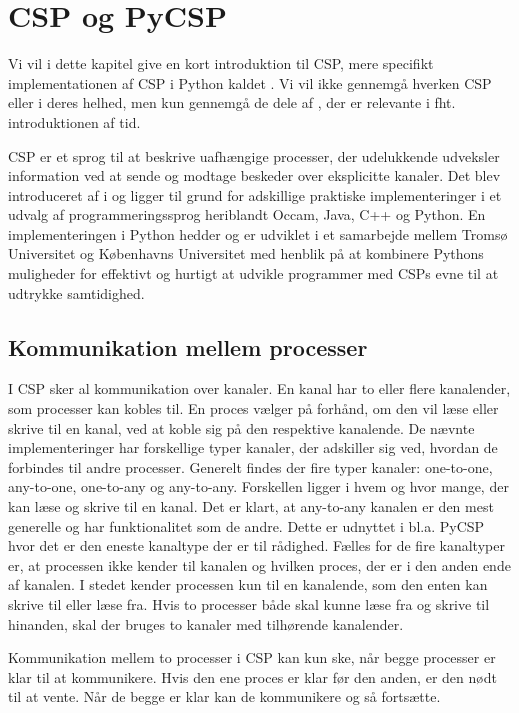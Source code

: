 \chapter{CSP og PyCSP}\label{chap:csp}

Vi vil i dette kapitel give en kort introduktion til CSP, mere specifikt implementationen af CSP i Python kaldet \pycsp. Vi vil ikke gennemgå hverken CSP eller \pycsp i deres helhed, men kun gennemgå de dele af \pycsp, der er relevante i fht. introduktionen af tid. 

CSP er et sprog til at beskrive uafhængige processer, der udelukkende udveksler information ved at sende og modtage beskeder over eksplicitte kanaler. Det blev introduceret af \citeauthor{hoare-csp} i \cite{hoare-csp} og ligger til grund for adskillige praktiske implementeringer i et udvalg af programmeringssprog heriblandt Occam, Java, C++ og Python\cite{May1983, jcsp, Brown2007, pycsp}. En implementeringen i Python hedder \pycsp og er udviklet i et samarbejde mellem Tromsø Universitet og Københavns Universitet med henblik på at kombinere  Pythons muligheder  for effektivt og hurtigt at udvikle programmer med CSPs evne til at udtrykke samtidighed\cite{pycsp}. 

\section{Kommunikation mellem processer}
I CSP sker al kommunikation over kanaler. En kanal har to eller flere kanalender, som processer kan kobles til. En proces vælger på forhånd, om den vil læse eller skrive til en kanal, ved at koble sig på den respektive kanalende. De nævnte implementeringer har forskellige typer kanaler, der adskiller sig ved,  hvordan de forbindes til andre processer. Generelt findes der fire typer kanaler: one-to-one, any-to-one, one-to-any og any-to-any. Forskellen ligger i hvem og hvor mange, der kan læse og skrive til en kanal. Det er klart, at any-to-any kanalen er den mest generelle og har funktionalitet som de andre. Dette er udnyttet i bl.a. PyCSP hvor det er den eneste kanaltype der er til rådighed. Fælles for de fire kanaltyper er, at processen ikke kender til kanalen og hvilken proces, der er i den anden ende af kanalen. I stedet kender processen kun til en  kanalende, som  den enten kan skrive til eller læse fra. Hvis to processer både skal kunne læse fra og skrive til hinanden, skal der bruges to kanaler med tilhørende kanalender. 

Kommunikation mellem to processer i CSP kan kun ske, når begge processer er klar til at kommunikere. Hvis den ene proces er klar før den anden, er den nødt til at vente. Når de begge er klar kan de kommunikere og så fortsætte.

